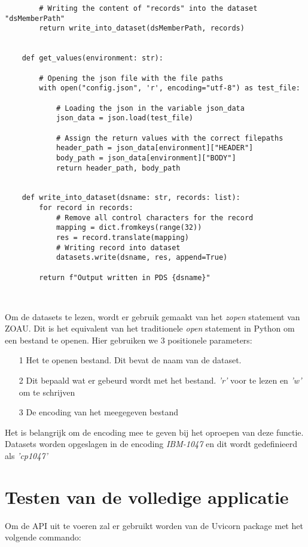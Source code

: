 \begin{lstlisting}
        # Writing the content of "records" into the dataset "dsMemberPath"   
        return write_into_dataset(dsMemberPath, records)
    
    
    def get_values(environment: str):
    
        # Opening the json file with the file paths 
        with open("config.json", 'r', encoding="utf-8") as test_file:
        
            # Loading the json in the variable json_data
            json_data = json.load(test_file)
            
            # Assign the return values with the correct filepaths
            header_path = json_data[environment]["HEADER"]
            body_path = json_data[environment]["BODY"] 
            return header_path, body_path
    
    
    def write_into_dataset(dsname: str, records: list):
        for record in records:
            # Remove all control characters for the record
            mapping = dict.fromkeys(range(32))
            res = record.translate(mapping)
            # Writing record into dataset
            datasets.write(dsname, res, append=True)
            
        return f"Output written in PDS {dsname}"
    
    
\end{lstlisting}
\vspace{10 mm}
Om de datasets te lezen, wordt er gebruik gemaakt van het \textit{zopen} statement van ZOAU. Dit is het equivalent van het traditionele \textit{open} statement in Python om een bestand te openen. Hier gebruiken we 3 positionele parameters: 
\begin{itemize}
    \item[1] Het te openen bestand. Dit bevat de naam van de dataset.
    \item[2] Dit bepaald wat er gebeurd wordt met het bestand. \textit{'r'} voor te lezen en \textit{'w'} om te schrijven
    \item[3] De encoding van het meegegeven bestand
\end{itemize} 
Het is belangrijk om de encoding mee te geven bij het oproepen van deze functie. Datasets worden opgeslagen in de encoding \textit{IBM-1047} en dit wordt gedefinieerd als \textit{'cp1047'}


\chapter{Testen van de volledige applicatie}
\label{ch:test-app}
Om de API uit te voeren zal er gebruikt worden van de Uvicorn package met het volgende commando:

